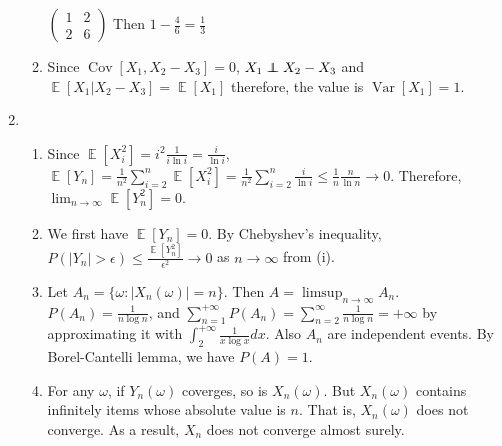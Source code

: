 \documentclass{article}
\DeclareMathOperator{\E}{\mathbb{E}}
\DeclareMathOperator{\Cov}{Cov}
\DeclareMathOperator{\Var}{Var}
\newcommand\independent{\protect\mathpalette{\protect\independenT}{\perp}}
\def\independenT#1#2{\mathrel{\rlap{$#1#2$}\mkern2mu{#1#2}}}
\begin{document}
\begin{enumerate}
\begin{enumerate}
    $\begin{pmatrix}1&2\\2&6\end{pmatrix}$
    Then $1-\frac{4}{6}=
    \frac{1}{3}$
    \item Since $\Cov[X_1,X_2-X_3]=0$, $X_1 \independent X_2-X_3$
    and $\E[X_1|X_2-X_3]=\E[X_1]$ therefore, the value is $\Var[X_1]=1$.
\end{enumerate}
\item 
\begin{enumerate}[label=(\roman*)]
    \item Since $\E[X_i^2]=i^2\frac{1}{i\ln i}=\frac{i}{\ln i}$, $\E[Y_n]=\frac{1}{n^2}\sum_{i=2}^n \E[X_i^2]=\frac{1}{n^2}\sum_{i=2}^n \frac{i}{\ln i} \leq \frac{1}{n} \frac{n}{\ln n} \to 0$.
    Therefore, $\lim_{n\to\infty}\E[Y^2_n] = 0$.
    \item We first have $\E[Y_n]=0$. By Chebyshev's inequality,
    $P(|Y_n|>\epsilon)\leq \frac{\E[Y_n^2]}{\epsilon^2} \to 0$ as $n\to\infty$
    from (i).
    \item Let $A_n=\{\omega: |X_n(\omega)|=n\}$. Then $A = \limsup_{n\to\infty}A_n $. $P(A_n) = \frac{1}{n\log n}$,
    and $\sum_{n=1}^{+\infty} P(A_n) = \sum_{n=2}^{\infty}\frac{1}{n\log n}=+\infty$ by approximating it with $\int_{2}^{+\infty} \frac{1}{x\log x}dx$. Also $A_n$ are independent events. By Borel-Cantelli lemma, we have $P(A)=1$.
    \item For any $\omega$, if $Y_n(\omega)$  coverges,
    so is $X_n(\omega)$. But $X_n(\omega)$ contains
    infinitely items whose absolute value is $n$.
    That is, $X_n(\omega)$ does not converge. As a result,
    $X_n$ does not converge almost surely.
\end{enumerate}
\end{enumerate}
\end{document}
